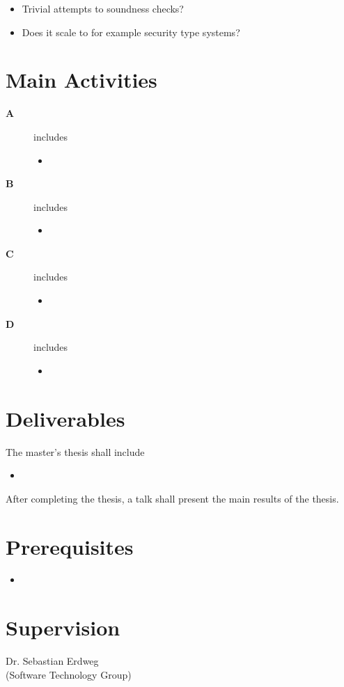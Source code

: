 \documentclass{scrartcl}
\begin{document}
\begin{itemize}
\item Trivial attempts to soundness checks?
\item Does it scale to for example security type systems?
\end{itemize}

\section{Main Activities}
\begin{description}
\item[{\bf A}] includes
  \begin{itemize}
    \item
  \end{itemize}

\item[{\bf B}] includes
  \begin{itemize}
    \item
  \end{itemize}

\item[{\bf C}] includes
  \begin{itemize}
  \item 
  \end{itemize}

\item[{\bf D}] includes
  \begin{itemize}
  \item
  \end{itemize}
\end{description}

\section{Deliverables}
The master's thesis shall include

\begin{itemize}
\item
\end{itemize}

After completing the thesis, a talk shall present the main results of the thesis.

\section{Prerequisites}

\begin{itemize}
\item 
\end{itemize}

\section{Supervision}
Dr. Sebastian Erdweg \\
(Software Technology Group)


\small

\end{document}
